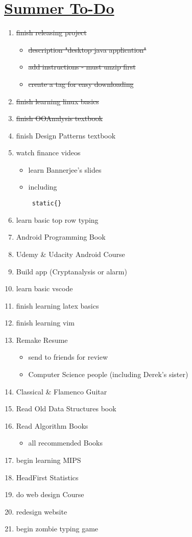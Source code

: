 \documentclass[10pt]{article}
\begin{document}
\section*{\underline{Summer To-Do}}

\begin{enumerate}
    \item \sout{finish releasing project}
    \begin{itemize}
	    \item \sout{description "desktop java application"}
	    \item \sout{add instructions - must unzip first}
        \item \sout{create a tag for easy downloading}
    \end{itemize}
    \item \sout{finish learning linux basics}
    \item \sout{finish OOAnalysis textbook}
    \item finish Design Patterns textbook
    \item watch finance videos
    \begin{itemize}
            \item learn Bannerjee's slides
            \item including \begin{verbatim} static{} \end{verbatim}
    \end{itemize}
    \item learn basic top row typing
    \item Android Programming Book
    \item Udemy \& Udacity Android Course
    \item Build app (Cryptanalysis or alarm)
    \item learn basic vscode
    \item finish learning latex basics
    \item finish learning vim
    \item Remake Resume
    \begin{itemize}
        \item send to friends for review
        \item Computer Science people (including Derek's sister)
    \end{itemize}
    \item Classical \& Flamenco Guitar
    \item Read Old Data Structures book
    \item Read Algorithm Books
    \begin{itemize}
        \item all recommended Books
    \end{itemize}
    \item begin learning MIPS
    \item HeadFirst Statistics
    \item do web design Course
    \item redesign website
    \item begin zombie typing game

\end{enumerate}
\end{document}
